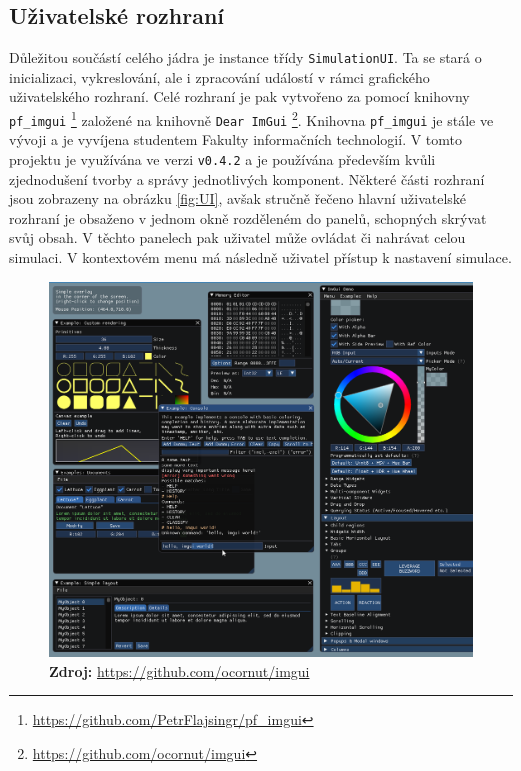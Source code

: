 \subsection{Uživatelské rozhraní}
\label{chapter:uzivRozh}

Důležitou součástí celého jádra je instance třídy \texttt{SimulationUI}. Ta se stará o inicializaci, vykreslování, ale i zpracování událostí v rámci grafického uživatelského rozhraní. Celé rozhraní je pak vytvořeno za pomocí knihovny \texttt{pf\_imgui} \footnote{\url{https://github.com/PetrFlajsingr/pf_imgui}} založené na knihovně \texttt{Dear ImGui} \footnote{\url{https://github.com/ocornut/imgui}}. Knihovna \texttt{pf\_imgui} je stále ve vývoji a je vyvíjena studentem Fakulty informačních technologií. V tomto projektu je využívána ve verzi  \texttt{v0.4.2} a je používána především kvůli zjednodušení tvorby a správy jednotlivých komponent. Některé části rozhraní jsou zobrazeny na obrázku \ref{fig:UI}, avšak stručně řečeno hlavní uživatelské rozhraní je obsaženo v jednom okně rozděleném do panelů, schopných skrývat svůj obsah. V těchto panelech pak uživatel může ovládat či nahrávat celou simulaci. V kontextovém menu má následně uživatel přístup k nastavení simulace.


\begin{figure}[h!]
	\centering
	\captionsetup{justification=centering}
	\includegraphics[scale=0.1]{obrazky-figures/imgui.png}
	\textbf{Zdroj: } \url{https://github.com/ocornut/imgui}
	\label{fig:structsEvap}
\end{figure}

